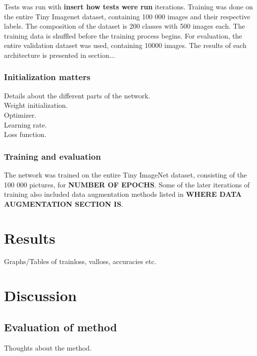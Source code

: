 \documentclass{kthreport}
\begin{document}

\FloatBarrier


\FloatBarrier


Tests was run with \textbf{insert how tests were run} iterations. Training was done on the entire Tiny Imagenet dataset, containing 100 000 images and their respective labels. The composition of the dataset is 200 classes with 500 images each. The training data is shuffled before the training process begins. For evaluation, the entire validation dataset was used, containing 10000 images. The results of each architecture is presented in section...

\subsubsection{Initialization matters}

Details about the different parts of the network.\\
Weight initialization.\\
Optimizer.\\
Learning rate.\\
Loss function.\\




\subsubsection{Training and evaluation}
The network was trained on the entire Tiny ImageNet dataset, consisting of the 100 000 pictures, for \textbf{NUMBER OF EPOCHS}. Some of the later iterations of training also included data augmentation methods listed in \textbf{WHERE DATA AUGMENTATION SECTION IS}.

\section{Results}
Graphs/Tables of trainloss, valloss, accuracies etc.


\section{Discussion}

\subsection{Evaluation of method}
Thoughts about the method.
\end{document}
